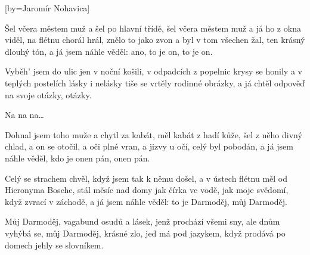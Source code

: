 [by={Jaromír Nohavica}]

\beginverse{}
Šel včera městem muž a šel po hlavní třídě,
šel včera městem muž a já ho z okna viděl,
na flétnu chorál hrál, znělo to jako zvon
a byl v tom všechen žal, ten krásný dlouhý tón,
a já jsem náhle věděl: ano, to je on, to je on.
\endverse{}

\beginverse{}
\chordsoff{}
Vyběh' jsem do ulic jen v noční košili, 
v odpadcích z popelnic krysy se honily 
a v teplých postelích lásky i nelásky 
tiše se vrtěly rodinné obrázky, 
a já chtěl odpověď na svoje otázky, otázky.
\chordson{}
\endverse{}

\beginchorus{}
Na na na\ldots{}     
       
\endchorus{}

\beginverse{}
\chordsoff{}
Dohnal jsem toho muže a chytl za kabát, 
měl kabát z hadí kůže, šel z něho divný chlad,
a on se otočil, a oči plné vran, 
a jizvy u očí, celý byl pobodán, 
a já jsem náhle věděl, kdo je onen pán, onen pán.
\chordson{}
\endverse{}

\beginverse{}
\chordsoff{}
Celý se strachem chvěl, když jsem tak k němu došel,
a v ústech flétnu měl od Hieronyma Bosche,
stál měsíc nad domy jak čírka ve vodě,
jak moje svědomí, když zvrací v záchodě, 
a já jsem náhle věděl: to je Darmoděj, můj Darmoděj.
\chordson{}
\endverse{}

\beginchorus{}
\chordsoff{}
Můj Darmoděj, vagabund osudů a lásek,
jenž prochází všemi sny, ale dnům vyhýbá se,
můj Darmoděj, krásné zlo, jed má pod jazykem,
když prodává po domech jehly se slovníkem.
\chordson{}
\endchorus{}

